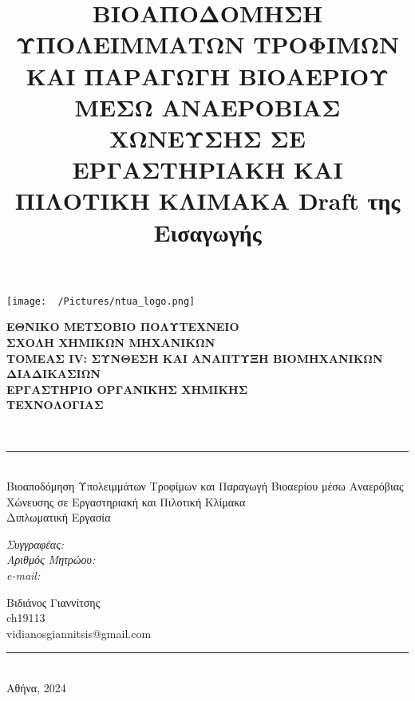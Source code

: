 \documentclass[11pt]{report}
\date{}
\title{ΒΙΟΑΠΟΔΟΜΗΣΗ ΥΠΟΛΕΙΜΜΑΤΩΝ ΤΡΟΦΙΜΩΝ ΚΑΙ ΠΑΡΑΓΩΓΗ ΒΙΟΑΕΡΙΟΥ ΜΕΣΩ ΑΝΑΕΡΟΒΙΑΣ ΧΩΝΕΥΣΗΣ ΣΕ ΕΡΓΑΣΤΗΡΙΑΚΗ ΚΑΙ ΠΙΛΟΤΙΚΗ ΚΛΙΜΑΚΑ Draft της Εισαγωγής}
\newcommand{\HRule}{\rule{\linewidth}{0.5mm}}
\begin{document}
\renewcommand{\abstractname}{Περίληψη}
\renewcommand{\tablename}{Πίνακας}
\renewcommand{\figurename}{Διάγραμμα}
\renewcommand{\chaptername}{Κεφάλαιο}
\renewcommand{\partname}{Μέρος}
\renewcommand{\listfigurename}{Περιεχόμενα Διαγραμμάτων: }
\renewcommand{\listtablename}{Περιεχόμενα Πινάκων: }
\renewcommand\listingscaption{Κώδικας}
\pagestyle{fancy}
\fancyhead{}
\fancyhead[L]{\chaptername~\thechapter}

\renewcommand{\contentsname}{Κεφάλαια: }
\begin{titlepage}

\begin{center}
  \begin{minipage}{0.2\textwidth}
    \begin{flushleft}
      \texttt{[image: ~/Pictures/ntua\_logo.png]}\\[0.4cm]    
    \end{flushleft}
  \end{minipage}
  \begin{minipage}{0.75\textwidth}
    \textsc{\bfseries \Large ΕΘΝΙΚΟ ΜΕΤΣΟΒΙΟ ΠΟΛΥΤΕΧΝΕΙΟ}\\[0.2cm]
    \textsc{\bfseries \Large ΣΧΟΛΗ ΧΗΜΙΚΩΝ ΜΗΧΑΝΙΚΩΝ}\\[0.2cm]
    \textsc{\large \bfseries ΤΟΜΕΑΣ IV: ΣΥΝΘΕΣΗ ΚΑΙ ΑΝΑΠΤΥΞΗ ΒΙΟΜΗΧΑΝΙΚΩΝ ΔΙΑΔΙΚΑΣΙΩΝ}\\[0.2cm]
    \textsc{\bfseries \large ΕΡΓΑΣΤΗΡΙΟ ΟΡΓΑΝΙΚΗΣ ΧΗΜΙΚΗΣ \\ ΤΕΧΝΟΛΟΓΙΑΣ}\\[0.2cm]
  \end{minipage}
  \\[2.5cm]

  \HRule \\[0.3cm]
  \Huge Βιοαποδόμηση Υπολειμμάτων Τροφίμων και Παραγωγή Βιοαερίου μέσω Αναερόβιας Χώνευσης σε Εργαστηριακή και Πιλοτική Κλίμακα\\[2.5cm]

  \huge Διπλωματική Εργασία \\[0.3cm]
   \begin{minipage}{0.4\textwidth}
    \begin{flushleft}
      \emph{\LARGE Συγγραφέας:}\\
	\emph{\LARGE Αριθμός Μητρώου:} \\
	\emph{\LARGE e-mail:}
      \end{flushleft}
    \end{minipage}
    \begin{minipage}{0.4\textwidth}
      \begin{flushright} \large
	\LARGE Βιδιάνος Γιαννίτσης\\
	\LARGE ch19113\\
	\LARGE vidianosgiannitsis@gmail.com
      \end{flushright}
    \end{minipage}
    \HRule \\[0.3cm]
  \vfill
{\LARGE Αθήνα, 2024}

\end{center}

\end{titlepage}
\end{document}
